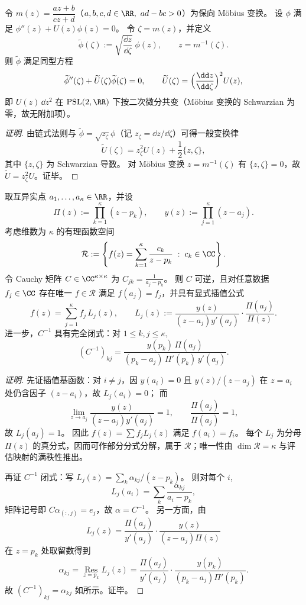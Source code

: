 \begin{conclusion}\label{con:xi-terminal-schrodinger-psl2r-quadratic-differential-covariance}
令 \(m(z)=\dfrac{az+b}{cz+d}\)（\(a,b,c,d\in\RR,\ ad-bc>0\)）为保向 Möbius 变换。
设 \(\phi\) 满足 \(\phi''(z)+U(z)\phi(z)=0\)。
令 \(\zeta=m(z)\)，并定义
\[
\widetilde\phi(\zeta):=\sqrt{\frac{\dd z}{\dd\zeta}}\;\phi(z),\qquad z=m^{-1}(\zeta).
\]
则 \(\widetilde\phi\) 满足同型方程
\[
\widetilde\phi''(\zeta)+\widetilde U(\zeta)\widetilde\phi(\zeta)=0,
\qquad
\widetilde U(\zeta)=\Bigl(\frac{\dd z}{\dd\zeta}\Bigr)^{2}U(z),
\]
即 \(U(z)\,\dd z^{2}\) 在 \(\mathrm{PSL}(2,\RR)\) 下按二次微分共变（Möbius 变换的 Schwarzian 为零，故无附加项）。
\end{conclusion}
\begin{proof}[证明]
由链式法则与 \(\widetilde\phi=\sqrt{z_\zeta}\phi\)（记 \(z_\zeta=\dd z/\dd\zeta\)）可得一般变换律
\[
\widetilde U(\zeta)=z_\zeta^{2}U(z)+\frac12\{z,\zeta\},
\]
其中 \(\{z,\zeta\}\) 为 Schwarzian 导数。
对 Möbius 变换 \(z=m^{-1}(\zeta)\) 有 \(\{z,\zeta\}=0\)，故 \(\widetilde U=z_\zeta^{2}U\)。证毕。
\end{proof}

\begin{conclusion}\label{con:xi-terminal-cauchy-lagrange-rational-interpolation-cauchy-inverse}
取互异实点 \(a_1,\dots,a_\kappa\in\RR\)，并设
\[
\Pi(z):=\prod_{k=1}^{\kappa}(z-p_k),\qquad
y(z):=\prod_{j=1}^{\kappa}(z-a_j).
\]
考虑维数为 \(\kappa\) 的有理函数空间
\[
\mathcal R:=\left\{f(z)=\sum_{k=1}^{\kappa}\frac{c_k}{z-p_k}\;:\;c_k\in\CC\right\}.
\]
令 Cauchy 矩阵 \(C\in\CC^{\kappa\times\kappa}\) 为 \(C_{jk}=\frac{1}{a_j-p_k}\)。
则 \(C\) 可逆，且对任意数据 \(f_j\in\CC\) 存在唯一 \(f\in\mathcal R\) 满足 \(f(a_j)=f_j\)，并具有显式插值公式
\[
f(z)=\sum_{j=1}^{\kappa} f_j\,L_j(z),
\qquad
L_j(z):=\frac{y(z)}{(z-a_j)y'(a_j)}\cdot\frac{\Pi(a_j)}{\Pi(z)}.
\]
进一步，\(C^{-1}\) 具有完全闭式：对 \(1\le k,j\le\kappa\),
\[
(C^{-1})_{k j}
=\frac{y(p_k)\,\Pi(a_j)}{(p_k-a_j)\,\Pi'(p_k)\,y'(a_j)}.
\]
\end{conclusion}
\begin{proof}[证明]
先证插值基函数：对 \(i\ne j\)，因 \(y(a_i)=0\) 且 \(y(z)/(z-a_j)\) 在 \(z=a_i\) 处仍含因子 \((z-a_i)\)，故 \(L_j(a_i)=0\)；
而
\[
\lim_{z\to a_j}\frac{y(z)}{(z-a_j)y'(a_j)}=1,
\qquad
\frac{\Pi(a_j)}{\Pi(a_j)}=1,
\]
故 \(L_j(a_j)=1\)。
因此 \(f(z)=\sum f_j L_j(z)\) 满足 \(f(a_i)=f_i\)。
每个 \(L_j\) 为分母 \(\Pi(z)\) 的真分式，因而可作部分分式分解，属于 \(\mathcal R\)；唯一性由 \(\dim\mathcal R=\kappa\) 与评估映射的满秩性推出。
\par
再证 \(C^{-1}\) 闭式：写 \(L_j(z)=\sum_{k} \alpha_{kj}/(z-p_k)\)。
则对每个 \(i\),
\[
L_j(a_i)=\sum_k\frac{\alpha_{kj}}{a_i-p_k},
\]
矩阵记号即 \(C\alpha_{(:,j)}=e_j\)，故 \(\alpha=C^{-1}\)。
另一方面，由
\[
L_j(z)=\frac{\Pi(a_j)}{y'(a_j)}\cdot\frac{y(z)}{(z-a_j)\Pi(z)}
\]
在 \(z=p_k\) 处取留数得到
\[
\alpha_{k j}
=\operatorname*{Res}_{z=p_k}L_j(z)
=\frac{\Pi(a_j)}{y'(a_j)}\cdot\frac{y(p_k)}{(p_k-a_j)\Pi'(p_k)}.
\]
故 \((C^{-1})_{kj}=\alpha_{kj}\) 如所示。证毕。
\end{proof}

